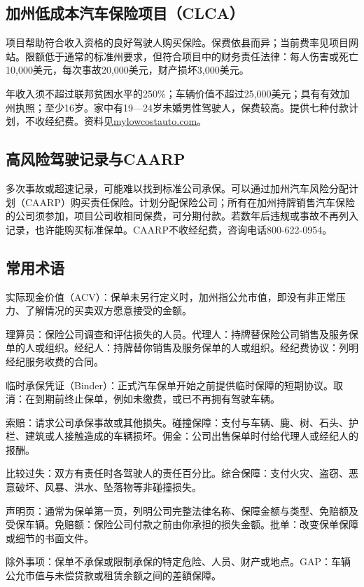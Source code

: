 \documentclass[UTF8,fontset=none,11pt,a4paper]{ctexart}
\begin{document}
\subsection*{加州低成本汽车保险项目（CLCA）}
项目帮助符合收入资格的良好驾驶人购买保险。保费依县而异；当前费率见项目网站。限额低于通常的标准州要求，但符合项目中的财务责任法律：每人伤害或死亡10,000美元，每次事故20,000美元，财产损坏3,000美元。


年收入须不超过联邦贫困水平的250\%；车辆价值不超过25,000美元；具有有效加州执照；至少16岁。家中有19—24岁未婚男性驾驶人，保费较高。提供七种付款计划，不收经纪费。资料见\url{mylowcostauto.com}。


\subsection*{高风险驾驶记录与CAARP}
多次事故或超速记录，可能难以找到标准公司承保。可以通过加州汽车风险分配计划（CAARP）购买责任保险。计划分配保险公司；所有在加州持牌销售汽车保险的公司须参加，项目公司收相同保费，可分期付款。若数年后违规或事故不再列入记录，也许能购买标准保单。CAARP不收经纪费，咨询电话800-622-0954。


\subsection*{常用术语}
实际现金价值（ACV）：保单未另行定义时，加州指公允市值，即没有非正常压力、了解情况的买卖双方愿意接受的金额。


理算员：保险公司调查和评估损失的人员。代理人：持牌替保险公司销售及服务保单的人或组织。经纪人：持牌替你销售及服务保单的人或组织。经纪费协议：列明经纪服务收费的合同。


临时承保凭证（Binder）：正式汽车保单开始之前提供临时保障的短期协议。取消：在到期前终止保单，例如未缴费，或已不再拥有驾驶车辆。


索赔：请求公司承保事故或其他损失。碰撞保障：支付与车辆、鹿、树、石头、护栏、建筑或人接触造成的车辆损坏。佣金：公司出售保单时付给代理人或经纪人的报酬。


比较过失：双方有责任时各驾驶人的责任百分比。综合保障：支付火灾、盗窃、恶意破坏、风暴、洪水、坠落物等非碰撞损失。


声明页：通常为保单第一页，列明公司完整法律名称、保障金额与类型、免赔额及受保车辆。免赔额：保险公司付款之前由你承担的损失金额。批单：改变保单保障或细节的书面文件。


除外事项：保单不承保或限制承保的特定危险、人员、财产或地点。GAP：车辆公允市值与未偿贷款或租赁余额之间的差額保障。
\end{document}
